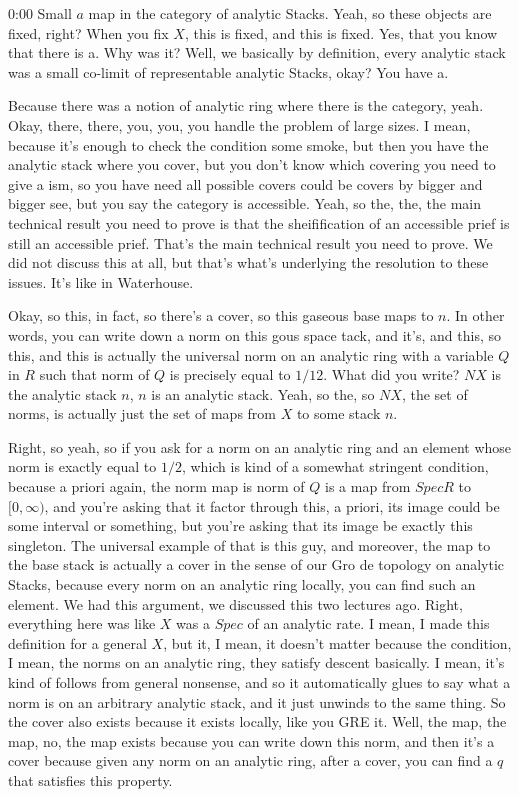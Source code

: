 \begin{unfinished}{0:00}
Small $a$ map in the category of analytic Stacks. Yeah, so these objects are fixed, right? When you fix $X$, this is fixed, and this is fixed. Yes, that you know that there is a. Why was it? Well, we basically by definition, every analytic stack was a small co-limit of representable analytic Stacks, okay? You have a.

Because there was a notion of analytic ring where there is the category, yeah. Okay, there, there, you, you, you handle the problem of large sizes. I mean, because it's enough to check the condition some smoke, but then you have the analytic stack where you cover, but you don't know which covering you need to give a ism, so you have need all possible covers could be covers by bigger and bigger see, but you say the category is accessible. Yeah, so the, the, the main technical result you need to prove is that the sheifification of an accessible prief is still an accessible prief. That's the main technical result you need to prove. We did not discuss this at all, but that's what's underlying the resolution to these issues. It's like in Waterhouse.

Okay, so this, in fact, so there's a cover, so this gaseous base maps to $n$. In other words, you can write down a norm on this gous space tack, and it's, and this, so this, and this is actually the universal norm on an analytic ring with a variable $Q$ in $R$ such that norm of $Q$ is precisely equal to $1/12$. What did you write? $NX$ is the analytic stack $n$, $n$ is an analytic stack. Yeah, so the, so $NX$, the set of norms, is actually just the set of maps from $X$ to some stack $n$.

Right, so yeah, so if you ask for a norm on an analytic ring and an element whose norm is exactly equal to $1/2$, which is kind of a somewhat stringent condition, because a priori again, the norm map is norm of $Q$ is a map from $Spec R$ to $[0, \infty)$, and you're asking that it factor through this, a priori, its image could be some interval or something, but you're asking that its image be exactly this singleton. The universal example of that is this guy, and moreover, the map to the base stack is actually a cover in the sense of our Gro de topology on analytic Stacks, because every norm on an analytic ring locally, you can find such an element. We had this argument, we discussed this two lectures ago. Right, everything here was like $X$ was a $Spec$ of an analytic rate. I mean, I made this definition for a general $X$, but it, I mean, it doesn't matter because the condition, I mean, the norms on an analytic ring, they satisfy descent basically. I mean, it's kind of follows from general nonsense, and so it automatically glues to say what a norm is on an arbitrary analytic stack, and it just unwinds to the same thing. So the cover also exists because it exists locally, like you GRE it. Well, the map, the map, no, the map exists because you can write down this norm, and then it's a cover because given any norm on an analytic ring, after a cover, you can find a $q$ that satisfies this property.


\end{unfinished}
